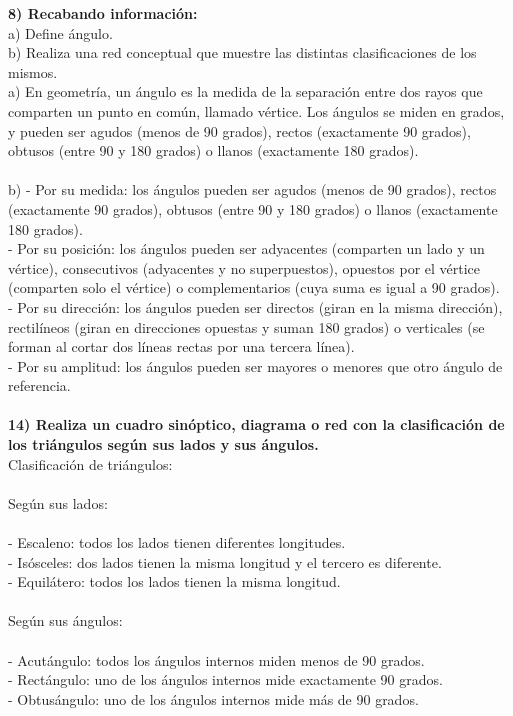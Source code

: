 \documentclass{article}
\begin{document}
{\bf 8) Recabando información: } \\
a) Define ángulo.\\
b) Realiza una red conceptual que muestre las distintas clasificaciones de los mismos.\\

a)  En geometría, un ángulo es la medida de la separación entre dos rayos que comparten un punto en común, llamado vértice. Los ángulos se miden en grados, y pueden ser agudos (menos de 90 grados), rectos (exactamente 90 grados), obtusos (entre 90 y 180 grados) o llanos (exactamente 180 grados).\\
\\
b) - Por su medida: los ángulos pueden ser agudos (menos de 90 grados), rectos (exactamente 90 grados), obtusos (entre 90 y 180 grados) o llanos (exactamente 180 grados).\\
- Por su posición: los ángulos pueden ser adyacentes (comparten un lado y un vértice), consecutivos (adyacentes y no superpuestos), opuestos por el vértice (comparten solo el vértice) o complementarios (cuya suma es igual a 90 grados).\\
- Por su dirección: los ángulos pueden ser directos (giran en la misma dirección), rectilíneos (giran en direcciones opuestas y suman 180 grados) o verticales (se forman al cortar dos líneas rectas por una tercera línea).\\
- Por su amplitud: los ángulos pueden ser mayores o menores que otro ángulo de referencia.\\
\\
{\bf 14) Realiza un cuadro sinóptico, diagrama o red con la clasificación de los triángulos según sus lados y sus ángulos.}\\
Clasificación de triángulos:\\
\\
Según sus lados:\\
\\
- Escaleno: todos los lados tienen diferentes longitudes.\\
- Isósceles: dos lados tienen la misma longitud y el tercero es diferente.\\
- Equilátero: todos los lados tienen la misma longitud.\\
\\
Según sus ángulos:\\
\\
- Acutángulo: todos los ángulos internos miden menos de 90 grados.\\
- Rectángulo: uno de los ángulos internos mide exactamente 90 grados.\\
- Obtusángulo: uno de los ángulos internos mide más de 90 grados.\\
\\
\\
\end{document}
